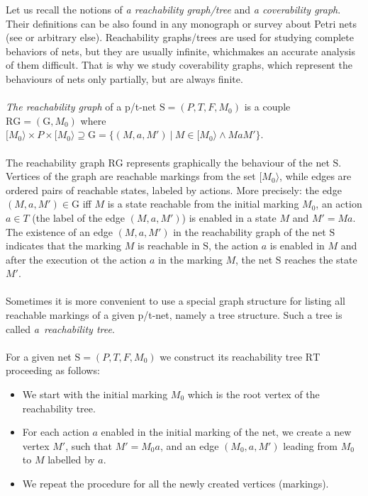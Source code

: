 \documentclass[a4paper]{llncs}
\begin{document}
Let us recall the notions of  \emph{a reachability graph/tree} and \emph{a coverability graph}. Their definitions can be also found in any monograph or survey about Petri nets (see \cite{DeselReisig,Starke} or arbitrary else). Reachability graphs/trees are used for studying complete behaviors of nets, but they are usually infinite, whichmakes an accurate analysis of them difficult. That is why we study coverability graphs, which represent the behaviours of nets only partially, but are always finite.
\\ \\
\emph{The reachability graph} of a p/t-net $\mathrm{S}=(P,T,F,M_0)$ is a couple $\mathrm{RG}=(\mathrm{G},M_0)$ where $[M_0\rangle\times P \times [M_0\rangle\supseteq\mathrm{G}=\{(M,a,M')\ |\ M\in[M_0\rangle\land MaM'\}$.
\\ \\
The reachability graph $\mathrm{RG}$ represents graphically the behaviour of the net $\mathrm{S}$. Vertices of the graph are reachable markings from the set $[M_0\rangle$, while edges are ordered pairs of reachable states, labeled by actions. More precisely: the edge $(M,a,M')\in\mathrm{G}$ iff $M$ is a state reachable from the initial marking $M_0$, an action $a\in T$ (the label of the edge $(M,a,M')$) is enabled in a state $M$ and $M'=Ma$. The existence of an edge $(M,a,M')$ in the reachability graph of the net $\mathrm{S}$ indicates that the marking $M$ is reachable in $\mathrm{S}$, the action $a$ is enabled in $M$ and after the execution ot the action $a$ in the marking $M$, the net $\mathrm{S}$ reaches the state $M'$.
\\ \\
Sometimes it is more convenient to use a special graph structure for listing all reachable markings of a given p/t-net, namely a tree structure. Such a tree is called \emph{a~reachability tree}. 
\\ \\For a given net $\mathrm{S}=(P,T,F,M_0)$ we construct its reachability tree $\mathrm{RT}$ proceeding as follows:
\begin{itemize}
\item We start with the initial marking $M_0$ which is the root vertex of the reachability tree.
\item For each action $a$ enabled in the initial marking of the net, we create a new vertex $M'$, such that $M'=M_0a$, and an edge $(M_0,a,M')$ leading from $M_0$ to $M$ labelled by $a$. 
\item We repeat the procedure for all the newly created vertices (markings).
\end{itemize}\mbox{ }\\
\end{document}
